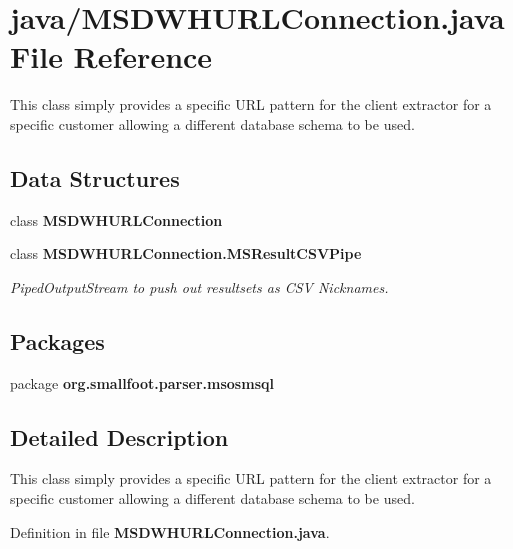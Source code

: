 \section{java/\+M\+S\+D\+W\+H\+U\+R\+L\+Connection.java File Reference}
\label{MSDWHURLConnection_8java}


This class simply provides a specific U\+R\+L pattern for the client extractor for a specific customer allowing a different database schema to be used.  


\subsection*{Data Structures}
\begin{DoxyCompactItemize}
\item 
class {\bf M\+S\+D\+W\+H\+U\+R\+L\+Connection}
\item 
class {\bf M\+S\+D\+W\+H\+U\+R\+L\+Connection.\+M\+S\+Result\+C\+S\+V\+Pipe}
\begin{DoxyCompactList}\small\item\em Piped\+Output\+Stream to push out resultsets as C\+S\+V Nicknames. \end{DoxyCompactList}\end{DoxyCompactItemize}
\subsection*{Packages}
\begin{DoxyCompactItemize}
\item 
package {\bf org.\+smallfoot.\+parser.\+msosmsql}
\end{DoxyCompactItemize}


\subsection{Detailed Description}
This class simply provides a specific U\+R\+L pattern for the client extractor for a specific customer allowing a different database schema to be used. 



Definition in file {\bf M\+S\+D\+W\+H\+U\+R\+L\+Connection.\+java}.

